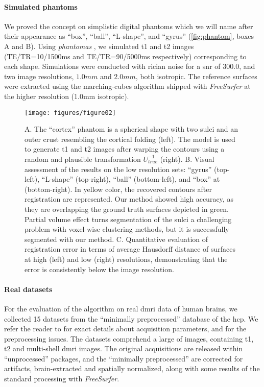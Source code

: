 \paragraph*{Simulated phantoms}%
\label{sec:digital_phantoms}
We proved the concept on simplistic digital phantoms which we will name after their
  appearance as ``box'', ``ball'', ``L-shape'', and ``gyrus'' (\autoref{fig:phantom},
  boxes A and B).
Using \emph{phantomas} \citep{caruyer_phantomas_2014}, we simulated \gls*{t1} and
  \gls*{t2} images (TE/TR=10/1500ms and TE/TR=90/5000ms
  respectively) corresponding to each shape.
Simulations were conducted with rician noise for a \gls*{snr} of 300.0, and
  two image resolutions, $1.0mm$ and $2.0mm$, both isotropic.
The reference surfaces were extracted using the marching-cubes algorithm
  shipped with \emph{FreeSurfer} \citep{fischl_freesurfer_2012}
  at the higher resolution (1.0mm isotropic).

\begin{figure*}
	\texttt{[image: figures/figure02]}
	\caption{A. The ``cortex'' phantom is a spherical shape with two sulci and an
	  outer crust resembling the cortical folding (left).
	The model is used to generate \gls*{t1} and \gls*{t2} images after warping the
	  contours using a random and plausible transformation $U_{true}^{-1}$ (right).
	B. Visual assessment of the results on the low resolution sets:
	  ``gyrus'' (top-left), ``L-shape'' (top-right), ``ball'' (bottom-left),
	  and ``box'' at (bottom-right).
	In yellow color, the recovered contours after registration are represented.
	Our method showed high accuracy, as they are overlapping the ground truth surfaces
	  depicted in green.
	Partial volume effect turns segmentation of the sulci a challenging problem with voxel-wise
	  clustering methods, but it is successfully segmented with our method.
	C. Quantitative evaluation of registration error in terms of average Hausdorff distance of
	  surfaces at high (left) and low (right) resolutions, demonstrating that the error is
	  consistently below the image resolution.
	  }\label{fig:phantom}
\end{figure*}

\paragraph*{Real datasets} %
\label{sec:human_connectome}
%
For the evaluation of the algorithm on real \gls*{dmri} data of human brains,
  we collected 15 datasets from the ``minimally preprocessed''
	 database of the \gls*{hcp}.
We refer the reader to \citep{essen_human_2012} for exact details about acquisition
  parameters, and \citep{glasser_minimal_2013} for the preprocessing issues.
The datasets comprehend a large of images, containing \gls*{t1}, \gls*{t2} and
  multi-shell \gls*{dmri} images.
The original acquisitions are released within ``unprocessed'' packages, and
  the ``minimally preprocessed'' are corrected for artifacts, brain-extracted
  and spatially normalized, along with some results of the standard processing with
  \emph{FreeSurfer}.

